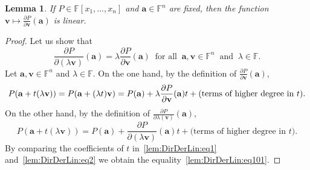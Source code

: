 \documentclass{elsarticle}
\def\F{{\mathbb F}}
\newtheorem{lemma}[theorem]{Lemma}
\theoremstyle{definition}
\numberwithin{equation}{section}
\begin{document}
\begin{lemma}\label{lem:DirDerLin}
If $P \in \F[x_1,\ldots, x_n]$ and $\mathbf a \in \F^n$ are fixed, then the function $\mathbf v \mapsto  \frac{\partial P}{\partial \mathbf v}(\mathbf a)$ is linear.
\end{lemma}
\begin{proof}Let us show that 
\begin{equation}\label{lem:DirDerLin:eq101}
\frac{\partial P}{\partial (\lambda \mathbf v)}(\mathbf a) = \lambda\frac{\partial P}{\partial \mathbf v}(\mathbf a)\;\;\mbox{for all}\;\;\mathbf a, \mathbf v \in \F^n\;\;\mbox{and}\;\;\lambda \in \F.
\end{equation}
Let $\mathbf a, \mathbf v \in \F^n$ and $\lambda \in \F$. %
On the one hand, by the definition of $\frac{\partial P}{\partial \mathbf v}(\mathbf a)$,
\begin{equation}\label{lem:DirDerLin:eq1}
P(\mathbf a + t (\lambda \mathbf v)) = P(\mathbf a + (\lambda t)  \mathbf v)\\ 
= P(\mathbf a)  + \lambda \frac{\partial P}{\partial \mathbf v}(\mathbf a)t + \mbox{(terms of higher degree in $t$)}.
\end{equation}
On the other hand, by the definition of $\frac{\partial P}{\partial \lambda (\mathbf v)}(\mathbf a)$,
\begin{equation}\label{lem:DirDerLin:eq2}
P(\mathbf a + t (\lambda \mathbf v)) 
= P(\mathbf a)  + \frac{\partial P}{\partial (\lambda \mathbf v)}(\mathbf a)t + \mbox{(terms of higher degree in $t$)}.
\end{equation}
By comparing the coefficients of $t$ in~\eqref{lem:DirDerLin:eq1} and~\eqref{lem:DirDerLin:eq2} we obtain the equality~\eqref{lem:DirDerLin:eq101}. %


\end{proof}
\end{document}
